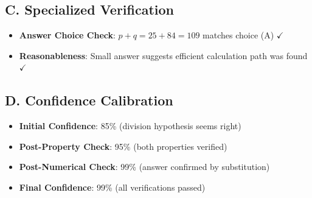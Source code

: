 \documentclass[11pt]{article}
\begin{document}
\begin{verificationbox}
\subsection*{C. Specialized Verification}
\begin{itemize}[leftmargin=*]
    \item \textbf{Answer Choice Check}: $p + q = 25 + 84 = 109$ matches choice (A) $\checkmark$
    \item \textbf{Reasonableness}: Small answer suggests efficient calculation path was found $\checkmark$
\end{itemize}

\subsection*{D. Confidence Calibration}
\begin{itemize}[leftmargin=*]
    \item \textbf{Initial Confidence}: 85\% (division hypothesis seems right)
    \item \textbf{Post-Property Check}: 95\% (both properties verified)
    \item \textbf{Post-Numerical Check}: 99\% (answer confirmed by substitution)
    \item \textbf{Final Confidence}: 99\% (all verifications passed)
\end{itemize}
\end{verificationbox}
\end{document}
